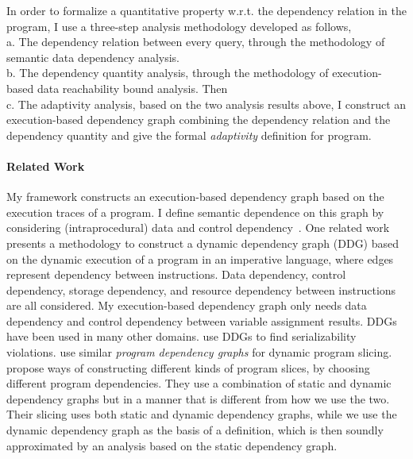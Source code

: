 
In order to formalize a quantitative property w.r.t. the dependency relation in the program, I
use a three-step analysis methodology developed as follows,
\\
 a. The dependency relation between every query, through the methodology of semantic data dependency analysis.
\\
 b. The dependency quantity analysis, through the methodology of execution-based data reachability bound analysis. Then 
\\
 c. The adaptivity analysis, based on the two analysis results above, 
 I construct an execution-based dependency graph combining the dependency relation and the dependency quantity
 and give the formal \emph{adaptivity} definition 
 for program.
 \paragraph*{Related Work}
 {
My framework constructs an execution-based dependency graph based on the execution traces of a program. I define semantic dependence on this graph by considering (intraprocedural) data and control dependency~\cite{bilardi1996framework,cytron1991efficiently,pollock1989incremental}. 
One related work 
\cite{austin1992dynamic} presents a methodology to construct a dynamic dependency graph (DDG) based on the dynamic execution of a program in an imperative language, where edges represent dependency between instructions. Data dependency, control dependency, storage dependency, and resource dependency between instructions are all considered. My execution-based dependency graph only needs data dependency and control dependency between variable assignment results. 
%
DDGs have been used in many other domains. \cite{nagar2018automated} use DDGs to find serializability violations. \cite{hammer2006dynamic} use similar \emph{program dependency graphs} \cite{ferrante1987program} for dynamic program slicing.
\cite{mastroeni2008data} propose ways of constructing different kinds of program slices, by choosing different program dependencies. 
They use a combination of 
static and dynamic dependency graphs but in a manner that is different from how we use the two. Their slicing uses both static and dynamic dependency graphs, while we use the dynamic dependency graph as the basis of a definition, which is then soundly approximated by an analysis based on the static dependency graph.}

